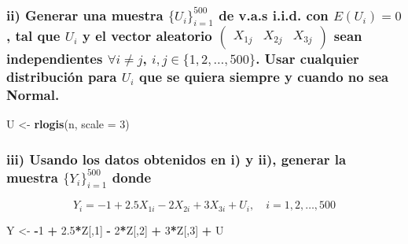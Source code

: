 \documentclass[
]{article}
\newenvironment{Shaded}{\begin{snugshade}}{\end{snugshade}}
\newcommand{\AttributeTok}[1]{\textcolor[rgb]{0.13,0.29,0.53}{#1}}
\newcommand{\DecValTok}[1]{\textcolor[rgb]{0.00,0.00,0.81}{#1}}
\newcommand{\FloatTok}[1]{\textcolor[rgb]{0.00,0.00,0.81}{#1}}
\newcommand{\FunctionTok}[1]{\textcolor[rgb]{0.13,0.29,0.53}{\textbf{#1}}}
\newcommand{\NormalTok}[1]{#1}
\newcommand{\OtherTok}[1]{\textcolor[rgb]{0.56,0.35,0.01}{#1}}
\newcommand{\SpecialCharTok}[1]{\textcolor[rgb]{0.81,0.36,0.00}{\textbf{#1}}}
\begin{document}
\subsubsection{\texorpdfstring{ii) Generar una muestra
\(\{U_i\}_{i=1}^{500}\) de v.a.s i.i.d. con \(E(U_i) = 0\), tal que
\(U_i\) y el vector aleatorio
\(\begin{pmatrix} X_{1j} & X_{2j} & X_{3j} \end{pmatrix}\) sean
independientes \(\forall i \neq j\), \(i, j \in \{1, 2, \ldots, 500\}\).
Usar cualquier distribución para \(U_i\) que se quiera siempre y cuando
\textbf{no} sea
Normal.}{ii) Generar una muestra \textbackslash\{U\_i\textbackslash\}\_\{i=1\}\^{}\{500\} de v.a.s i.i.d. con E(U\_i) = 0, tal que U\_i y el vector aleatorio \textbackslash begin\{pmatrix\} X\_\{1j\} \& X\_\{2j\} \& X\_\{3j\} \textbackslash end\{pmatrix\} sean independientes \textbackslash forall i \textbackslash neq j, i, j \textbackslash in \textbackslash\{1, 2, \textbackslash ldots, 500\textbackslash\}. Usar cualquier distribución para U\_i que se quiera siempre y cuando  sea Normal.}}\label{ii-generar-una-muestra-u_i_i1500-de-v.a.s-i.i.d.-con-eu_i-0-tal-que-u_i-y-el-vector-aleatorio-beginpmatrix-x_1j-x_2j-x_3j-endpmatrix-sean-independientes-forall-i-neq-j-i-j-in-1-2-ldots-500.-usar-cualquier-distribuciuxf3n-para-u_i-que-se-quiera-siempre-y-cuando-sea-normal.}

\begin{Shaded}
\begin{Highlighting}[]
\NormalTok{U }\OtherTok{\textless{}{-}} \FunctionTok{rlogis}\NormalTok{(n, }\AttributeTok{scale =} \DecValTok{3}\NormalTok{)}
\end{Highlighting}
\end{Shaded}

\subsubsection{\texorpdfstring{iii) Usando los datos obtenidos en i) y
ii), generar la muestra \(\{Y_i\}_{i=1}^500\)
donde}{iii) Usando los datos obtenidos en i) y ii), generar la muestra \textbackslash\{Y\_i\textbackslash\}\_\{i=1\}\^{}500 donde}}\label{iii-usando-los-datos-obtenidos-en-i-y-ii-generar-la-muestra-y_i_i1500-donde}

\[
Y_i = -1 + 2.5X_{1i} - 2X_{2i} + 3X_{3i} + U_i, \quad i = 1, 2, \dots, 500
\]

\begin{Shaded}
\begin{Highlighting}[]
\NormalTok{Y }\OtherTok{\textless{}{-}} \SpecialCharTok{{-}}\DecValTok{1} \SpecialCharTok{+} \FloatTok{2.5}\SpecialCharTok{*}\NormalTok{Z[,}\DecValTok{1}\NormalTok{] }\SpecialCharTok{{-}} \DecValTok{2}\SpecialCharTok{*}\NormalTok{Z[,}\DecValTok{2}\NormalTok{] }\SpecialCharTok{+} \DecValTok{3}\SpecialCharTok{*}\NormalTok{Z[,}\DecValTok{3}\NormalTok{] }\SpecialCharTok{+}\NormalTok{ U}
\end{Highlighting}
\end{Shaded}
\end{document}
